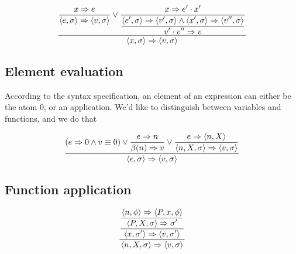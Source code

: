 \everymath{\displaystyle}

\begin{equation}
{\displaystyle
{\displaystyle
  x\Rightarrow e
\over\displaystyle
  \left\langle e,\sigma\right\rangle
  \Rightarrow
  \left\langle v,\sigma\right\rangle
}
\vee
{\displaystyle
  x\Rightarrow e'\cdot x'
\over\displaystyle
{\displaystyle
  \left\langle e',\sigma\right\rangle
  \Rightarrow
  \left\langle v',\sigma\right\rangle
\wedge
  \left\langle x',\sigma\right\rangle
  \Rightarrow
  \left\langle v'',\sigma\right\rangle
\over\displaystyle
  v'\cdot v'' \Rightarrow v
}
}
\over\displaystyle
  \left\langle x,\sigma\right\rangle
  \Rightarrow
  \left\langle v,\sigma\right\rangle
}
\end{equation}

\subsection{Element evaluation}

According to the syntax specification, an element of an expression can either
be the atom $0$, or an application. We'd like to distinguish between variables
and functions, and we do that  

\begin{equation}
{\displaystyle
\left(
    e\Rightarrow 0
  \wedge
    v\equiv 0
\right)
\vee
{\displaystyle
    e\Rightarrow n
\over\displaystyle
    \beta(n)\Rightarrow v
}
\vee
{\displaystyle
    e\Rightarrow \left\langle n, X\right\rangle
\over\displaystyle
    \left\langle n,X,\sigma\right\rangle
    \Rightarrow
    \left\langle v,\sigma\right\rangle
}
\over\displaystyle
\left\langle e,\sigma\right\rangle
\Rightarrow
\left\langle v,\sigma\right\rangle
}
\end{equation}

\subsection{Function application}

\begin{equation}
{\displaystyle
{\displaystyle
{\displaystyle
  \left\langle n, \phi\right\rangle
  \Rightarrow
  \left\langle P, x, \phi\right\rangle
\over\displaystyle
  \left\langle P, X, \sigma\right\rangle
  \Rightarrow
  \sigma'
}
\over\displaystyle
  \left\langle x, \sigma'\right\rangle
  \Rightarrow
  \left\langle v,\sigma'\right\rangle
}
\over\displaystyle
    \left\langle n,X,\sigma\right\rangle
    \Rightarrow
    \left\langle v,\sigma\right\rangle
}
\end{equation}

